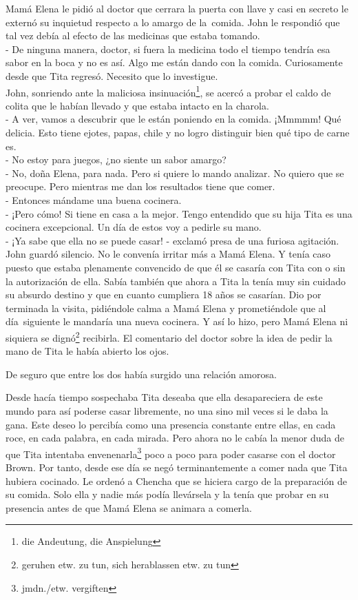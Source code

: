 Mamá Elena le pidió al doctor que cerrara la puerta con llave y casi en
secreto le externó su inquietud respecto a lo amargo de la~comida.
John le respondió que tal vez debía al efecto de las medicinas que
estaba tomando.
\\- De ninguna manera, doctor, si fuera la medicina todo el tiempo tendría %
esa sabor en la boca y no es así. Algo me están dando con la comida. %
Curiosamente desde que Tita regresó. Necesito que lo investigue.\\

John, sonriendo ante la maliciosa insinuación\footnote{die Andeutung, die Anspielung},
se acercó a probar el caldo de colita que le habían llevado y que estaba
intacto en la charola.
\\- A ver, vamos a descubrir que le están poniendo en la comida. ¡Mmmmm! %
Qué delicia. Esto tiene ejotes, papas, chile y \ndots no logro %
distinguir bien \ndots qué tipo de carne es. %
\\- No estoy para juegos, ¿no siente un sabor amargo? %
\\- No, doña Elena, para nada. Pero si quiere lo mando analizar. No quiero %
que se preocupe. Pero mientras me dan los resultados tiene que comer. %
\\- Entonces mándame una buena cocinera. %
\\- ¡Pero cómo! Si tiene en casa a la mejor. Tengo entendido que su hija %
Tita es una cocinera excepcional. Un día de estos voy a pedirle su mano. %
\\- ¡Ya sabe que ella no se puede casar! - exclamó presa de una furiosa %
agitación.\\

John guardó silencio. No le convenía irritar más a Mamá Elena. Y tenía
caso puesto que estaba plenamente convencido de que él se casaría con
Tita con o sin la autorización de ella. Sabía también que ahora a Tita
la tenía muy sin cuidado su absurdo destino y que en cuanto cumpliera 18
años se casarían. Dio por terminada la visita, pidiéndole calma a Mamá
Elena y prometiéndole que al día~siguiente le mandaría una nueva
cocinera. Y así lo hizo, pero Mamá Elena ni siquiera se dignó\footnote{geruhen etw. zu tun, sich herablassen etw. zu tun}
recibirla. El comentario del doctor sobre la idea de pedir la mano de
Tita le había abierto los ojos.

De seguro que entre los dos había surgido una relación amorosa.

Desde hacía tiempo sospechaba Tita deseaba que ella desapareciera de
este mundo para así poderse casar libremente, no una sino mil veces si
le daba la gana. Este deseo lo percibía como una presencia constante
entre ellas, en cada roce, en cada palabra, en cada mirada. Pero ahora
no le cabía la menor duda de que Tita intentaba envenenarla\footnote{jmdn./etw. vergiften}
poco a poco para poder casarse con el doctor Brown. Por tanto, desde ese día se negó
terminantemente a comer nada que Tita hubiera cocinado. Le ordenó a
Chencha que se hiciera cargo de la preparación de su comida. Solo ella y
nadie más podía llevársela y la tenía que probar en su presencia antes
de que Mamá Elena se animara a comerla.

